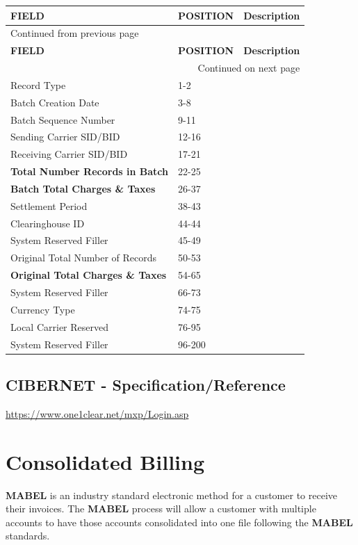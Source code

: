 \documentclass[12pt,twoside]{article}
\begin{document}
\begin{longtable}{l|l|l}
\hline
\textbf{FIELD} & \textbf{POSITION} & \textbf{Description}\\
\hline
\endfirsthead
\multicolumn{3}{l}{Continued from previous page} \\
\hline

\textbf{FIELD} & \textbf{POSITION} & \textbf{Description} \\

\hline
\endhead
\hline\multicolumn{3}{r}{Continued on next page} \\
\endfoot
\endlastfoot
\hline
Record Type & 1-2 & \\
Batch Creation Date & 3-8 & \\
Batch Sequence Number & 9-11 & \\
Sending Carrier SID/BID & 12-16 & \\
Receiving Carrier SID/BID & 17-21 & \\
\textbf{Total Number Records in Batch} & 22-25 & \\
\textbf{Batch Total Charges \& Taxes} & 26-37 & \\
Settlement Period & 38-43 & \\
Clearinghouse ID & 44-44 & \\
System Reserved Filler & 45-49 & \\
Original Total Number of Records & 50-53 & \\
\textbf{Original Total Charges \& Taxes} & 54-65 & \\
System Reserved Filler & 66-73 & \\
Currency Type & 74-75 & \\
Local Carrier Reserved & 76-95 & \\
System Reserved Filler & 96-200 & \\
\hline
\end{longtable}
\normalsize
\newpage
\subsection{CIBERNET - Specification/Reference}
\label{sec:orgheadline42}
\url{https://www.one1clear.net/mxp/Login.asp}
\section{Consolidated Billing}
\label{sec:orgheadline59}
\textbf{MABEL} is an industry standard electronic method for a customer to receive their invoices.  
The \textbf{MABEL} process will allow a customer with multiple accounts to have those accounts consolidated into one file following the \textbf{MABEL} standards. 
\end{document}
